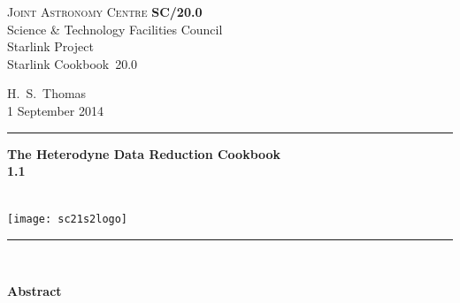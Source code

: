 \documentclass[twoside,11pt]{article}
\newcommand{\stardoccategory}  {Starlink Cookbook}
\newcommand{\stardocinitials}  {SC}
\newcommand{\stardocnumber}    {20.0}
\newcommand{\stardocauthors}   {H.\ S.\ Thomas}
\newcommand{\stardocdate}      {1 September 2014}
\newcommand{\stardoctitle}     {The Heterodyne Data Reduction Cookbook}
\newcommand{\stardocversion}   {1.1}
\newcommand{\stardocmanual}    {\ }
\newcommand{\stardocname}{\stardocinitials /\stardocnumber}
\newenvironment{latexonly}{}{}
\renewcommand{\_}{\texttt{\symbol{95}}}
\begin{document}
\thispagestyle{empty}

\begin{latexonly}
   \textsc{Joint Astronomy Centre} \hfill \textbf{\stardocname}\\
   {\large Science \& Technology Facilities Council}\\
   {\large Starlink Project\\}
   {\large \stardoccategory\ \stardocnumber}
   \begin{flushright}
   \stardocauthors\\
   \stardocdate
   \end{flushright}
   \vspace{-4mm}
   \rule{\textwidth}{0.5mm}
   \vspace{5mm}
   \begin{center}
   {\Huge\textbf{\stardoctitle \\ [2.5ex]}}
   {\LARGE\textbf{\stardocversion \\ [4ex]}}
   {\Huge\textbf{\stardocmanual}}
   \end{center}
   \vspace{5mm}

   \begin{center}
   \texttt{[image: sc21\_s2logo]}
   \end{center}
   \vspace{5mm}
   \rule{\textwidth}{0.5mm}\\
   \vspace{15mm}

   \vspace{10mm}
   \begin{center}
      {\Large\textbf{Abstract}}
   \end{center}

\end{latexonly}
\end{document}
